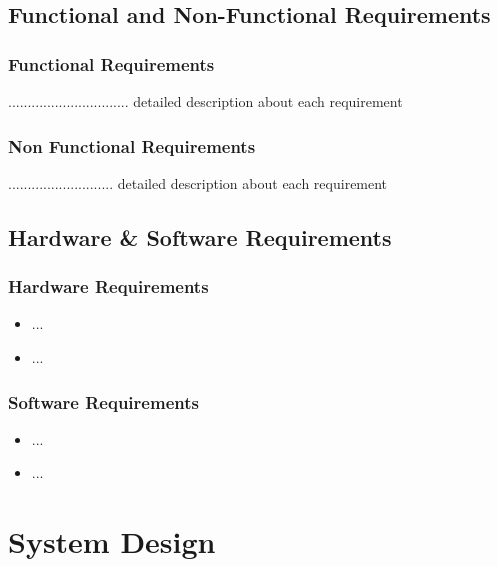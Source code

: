 \documentclass[11pt]{report}
\begin{document}
\section{Functional and Non-Functional Requirements}

\subsection{Functional Requirements}
...............................
detailed description about each requirement

\subsection{Non Functional Requirements}
 ...........................
 detailed description about each requirement


\section{Hardware \& Software Requirements}

\subsection{Hardware Requirements}
\begin{itemize}
  \item ...
  \item ...
\end{itemize}
\subsection{Software Requirements}
\begin{itemize}
  \item ...
  \item ...
\end{itemize}

  

\chapter{System Design}
\label{xx}
 



\end{document}
